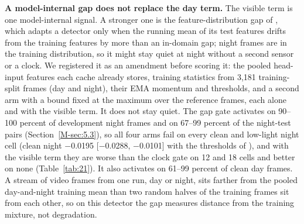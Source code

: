 \documentclass[journal,onecolumn]{IEEEtran}
\begin{document}
\textbf{A model-internal gap does not replace the day term.} The visible term is one model-internal signal. A stronger one is the feature-distribution gap of \citet{yoo2024what}, which adapts a detector only when the running mean of its test features drifts from the training features by more than an in-domain gap; night frames are in the training distribution, so it might stay quiet at night without a second sensor or a clock. We registered it as an amendment before scoring it: the pooled head-input features each cache already stores, training statistics from 3,181 training-split frames (day and night), their EMA momentum and thresholds, and a second arm with a bound fixed at the maximum over the reference frames, each alone and with the visible term. It does not stay quiet. The gap gate activates on 90--100 percent of development night frames and on 67--99 percent of the night-test pairs (Section~\ref{M-sec:5.3}), so all four arms fail on every clean and low-light night cell (clean night $-$0.0195 [$-$0.0288, $-$0.0101] with the thresholds of \citet{yoo2024what}), and with the visible term they are worse than the clock gate on 12 and 18 cells and better on none (Table~\ref{tab:21}). It also activates on 61--99 percent of clean day frames. A stream of video frames from one run, day or night, sits farther from the pooled day-and-night training mean than two random halves of the training frames sit from each other, so on this detector the gap measures distance from the training mixture, not degradation.
\end{document}
